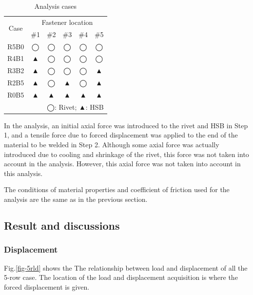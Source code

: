 \begin{table}[htbp]
\centering
\caption{Analysis cases}\label{tab-5rcase}
\begin{tabular}{@{}cccccc@{}}
\toprule
\multirow{2}{*}{Case} & \multicolumn{5}{c}{Fastener location} \\ \cmidrule(l){2-6} 
                      & \#1   & \#2   & \#3   & \#4   & \#5   \\ \midrule
R5B0                   & ◯     & ◯     & ◯     & ◯     & ◯     \\
R4B1                   & ▲     & ◯     & ◯     & ◯     & ◯     \\
R3B2                   & ▲     &◯     & ◯     & ◯     & ▲     \\
R2B5                   & ▲     & ◯     & ▲     & ◯     & ▲     \\
R0B5                   & ▲     & ▲     & ▲     & ▲     & ▲     \\ \midrule
\multicolumn{6}{r}{◯: Rivet; ▲: HSB}
\end{tabular}
\end{table}

In the analysis, an initial axial force was introduced to the rivet and \ac{HSB} in Step 1, and a tensile force due to forced displacement was applied to the end of the material to be welded in Step 2. Although some axial force was actually introduced due to cooling and shrinkage of the rivet, this force was not taken into account in the analysis. However, this axial force was not taken into account in this analysis.

The conditions of material properties and coefficient of friction used for the analysis are the same as in the previous section.

\subsection{Result and discussions}

\subsubsection{Displacement}

Fig.\ref{fig-5rld} shows the The relationship between load and displacement of all the 5-row case. The location of the load and displacement acquisition is where the forced displacement is given.

